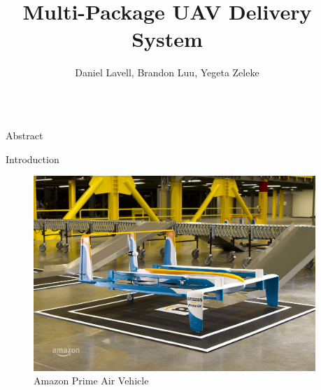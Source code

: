 \documentclass[final]{beamer}
\title{Multi-Package UAV Delivery System} %
\author{Daniel Lavell, Brandon Luu, Yegeta Zeleke} %
\institute{University of California, Santa Cruz} %
\newlength{\sepwid}
\newlength{\onecolwid}
\begin{document}

\setlength{\belowcaptionskip}{2ex} %
\setlength\belowdisplayshortskip{2ex} %

\begin{frame}[t] %

\begin{columns}[t] %

\begin{column}{\sepwid}\end{column} %

\begin{column}{\onecolwid} %


\begin{block}{Abstract}


\end{block}



\begin{block}{Introduction}



\end{block}


\begin{figure}
\includegraphics[width=0.8\linewidth]{images/prime-air.jpg}
\caption{Amazon Prime Air Vehicle}
\end{figure}


\end{column}
\end{columns}
\end{frame}
\end{document}
